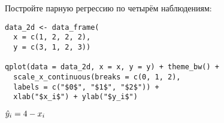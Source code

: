 \begin{problem}
Постройте парную регрессию по четырём наблюдениям:

\begin{verbatim}
data_2d <- data_frame(
  x = c(1, 2, 2, 2),
  y = c(3, 1, 2, 3))

qplot(data = data_2d, x = x, y = y) + theme_bw() +
  scale_x_continuous(breaks = c(0, 1, 2),
  labels = c("$0$", "$1$", "$2$")) +
  xlab("$x_i$") + ylab("$y_i$")
\end{verbatim}


\begin{minipage}{\textwidth}
\begin{tikzpicture}[scale = 0.025]

\end{tikzpicture}
\end{minipage}


\begin{sol}
$\hy_i = 4 - x_i$
\end{sol}
\end{problem}


